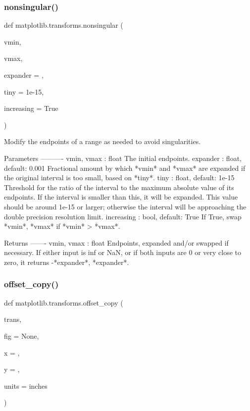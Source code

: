 \subsubsection{\texorpdfstring{nonsingular()}{nonsingular()}}
{\footnotesize\ttfamily def matplotlib.\+transforms.\+nonsingular (\begin{DoxyParamCaption}\item[{}]{vmin,  }\item[{}]{vmax,  }\item[{}]{expander = {},  }\item[{}]{tiny = {\ttfamily 1e-\/15},  }\item[{}]{increasing = {\ttfamily True} }\end{DoxyParamCaption})}

\begin{DoxyVerb}Modify the endpoints of a range as needed to avoid singularities.

Parameters
----------
vmin, vmax : float
    The initial endpoints.
expander : float, default: 0.001
    Fractional amount by which *vmin* and *vmax* are expanded if
    the original interval is too small, based on *tiny*.
tiny : float, default: 1e-15
    Threshold for the ratio of the interval to the maximum absolute
    value of its endpoints.  If the interval is smaller than
    this, it will be expanded.  This value should be around
    1e-15 or larger; otherwise the interval will be approaching
    the double precision resolution limit.
increasing : bool, default: True
    If True, swap *vmin*, *vmax* if *vmin* > *vmax*.

Returns
-------
vmin, vmax : float
    Endpoints, expanded and/or swapped if necessary.
    If either input is inf or NaN, or if both inputs are 0 or very
    close to zero, it returns -*expander*, *expander*.
\end{DoxyVerb}
 \mbox{\label{namespacematplotlib_1_1transforms_afa3ee002f4ec99121ca7f06a11c6cfc5}} 
\subsubsection{\texorpdfstring{offset\+\_\+copy()}{offset\_copy()}}
{\footnotesize\ttfamily def matplotlib.\+transforms.\+offset\+\_\+copy (\begin{DoxyParamCaption}\item[{}]{trans,  }\item[{}]{fig = {\ttfamily None},  }\item[{}]{x = {},  }\item[{}]{y = {},  }\item[{}]{units = {\ttfamily \textquotesingle{}inches\textquotesingle{}} }\end{DoxyParamCaption})}

